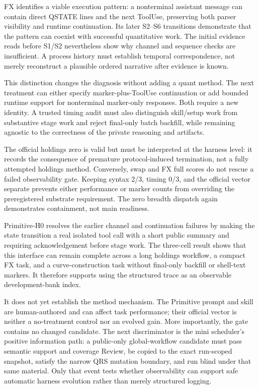 FX identifies a viable execution pattern: a nonterminal assistant message can
contain direct QSTATE lines and the next ToolUse, preserving both parser
visibility and runtime continuation. Its later S2--S6 transitions demonstrate
that the pattern can coexist with successful quantitative work. The initial
evidence reads before S1/S2 nevertheless show why channel and sequence checks
are insufficient. A process history must establish temporal correspondence,
not merely reconstruct a plausible ordered narrative after evidence is known.

This distinction changes the diagnosis without adding a quant method. The next
treatment can either specify marker-plus-ToolUse continuation or add bounded
runtime support for nonterminal marker-only responses. Both require a new
identity. A trusted timing audit must also distinguish skill/setup work from
substantive stage work and reject final-only batch backfill, while remaining
agnostic to the correctness of the private reasoning and artifacts.

The official holdings zero is valid but must be interpreted at the harness
level: it records the consequence of premature protocol-induced termination,
not a fully attempted holdings method. Conversely, swap and FX full scores do
not rescue a failed observability gate. Keeping syntax 2/3, timing 0/3, and the
official vector separate prevents either performance or marker counts from
overriding the preregistered substrate requirement. The zero breadth dispatch
again demonstrates containment, not main readiness.

Primitive-H0 resolves the earlier channel and continuation failures by making
the state transition a real isolated tool call with a short public summary and
requiring acknowledgement before stage work. The three-cell result shows that
this interface can remain complete across a long holdings workflow, a compact
FX task, and a curve-construction task without final-only backfill or shell-text
markers. It therefore supports using the structured trace as an observable
development-bank index.

It does not yet establish the method mechanism. The Primitive prompt and skill
are human-authored and can affect task performance; their official vector is
neither a no-treatment control nor an evolved gain. More importantly, the gate
contains no changed candidate. The next discriminator is the mini scheduler's
positive information path: a public-only global-workflow candidate must pass
semantic support and coverage Review, be copied to the exact run-scoped
snapshot, satisfy the narrow QRS mutation boundary, and run blind under that
same material. Only that event tests whether observability can support safe
automatic harness evolution rather than merely structured logging.

